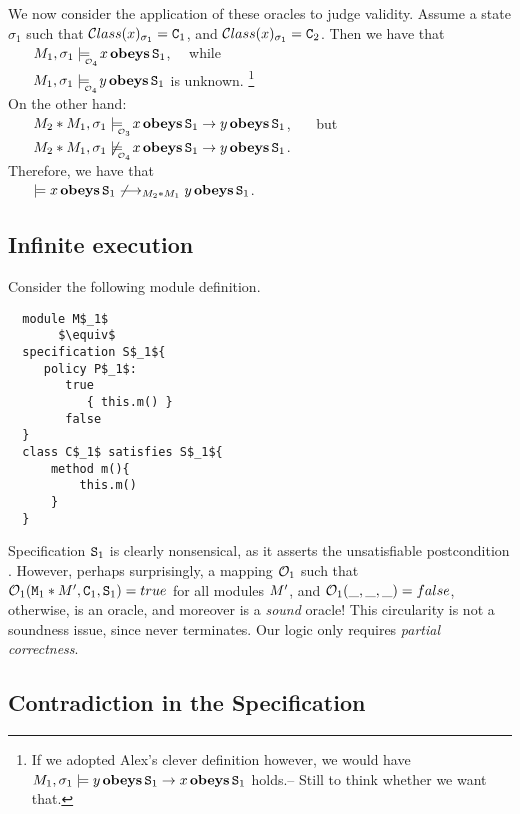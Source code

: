 We now consider the application of these oracles to judge validity.
Assume a state $\sigma_1$ such that ${\cal C}lass(x)_{\sigma_1}={\textrm{\ttfamily{C}}}_1$,
and ${\cal C}lass(x)_{\sigma_1}={\textrm{\ttfamily{C}}}_2$.
Then we have that \\
$~ \strut \ \ \ $ $\M_1, \sigma_1 \modelsWith{\O_4} x \obeys \prg{S}_1$, \ \ while\\
$~ \strut \ \ \ $  $\M_1, \sigma_1 \modelsWith{\O_4} y \obeys \prg{S}_1$ is unknown.
\footnote{If we adopted  Alex's clever definition however,  we would have $M_1, \sigma_1 \models y \,\textbf{\textrm{obeys}}\, {\textrm{\ttfamily{S}}}_1 \rightarrow  x \,\textbf{\textrm{obeys}}\, {\textrm{\ttfamily{S}}}_1$ holds.-- Still to think whether we want that.}
\\
On the other hand:\\
$~ \strut \ \ \ $ $\M_2*\M_1, \sigma_1 \modelsWith{{\O_3}} x \obeys \prg{S}_1 \rightarrow y \obeys \prg{S}_1$, \ \ \ but \\
$~ \strut \ \ \ $  $\M_2*\M_1, \sigma_1 \not\modelsWith{{\O_4} }x \obeys \prg{S}_1 \rightarrow y \obeys \prg{S}_1$.\\ Therefore,
we have that\\
 $~ \strut \ \ \ $ $\models  x \,\textbf{\textrm{obeys}}\, {\textrm{\ttfamily{S}}}_1 \not\longrightarrow_{M_2*M_1} y \,\textbf{\textrm{obeys}}\, {\textrm{\ttfamily{S}}}_1$.


\subsection{Infinite execution}

Consider the following module definition.

 \begin{lstlisting}
  module M$_1$
       $\equiv$
  specification S$_1${
     policy P$_1$:
        true
           { this.m() }
        false
  }
  class C$_1$ satisfies S$_1${
      method m(){
          this.m()
      }
  }
\end{lstlisting}

Specification ${\textrm{\ttfamily{S}}}_1$ is clearly nonsensical, as it asserts the
unsatisfiable postcondition . However, perhaps surprisingly,
 a mapping  ${\cal O}_1$ such that ${\cal O}_1({\textrm{\ttfamily{M}}}_1*M',{\textrm{\ttfamily{C}}}_1,{\textrm{\ttfamily{S}}}_1)=true$ for all modules $M'$,
and ${\cal O}_1(\_,\_,\_)=false$, otherwise, is an oracle, and moreover is a {\em sound} oracle!
 This circularity is not
a soundness issue,   since  never terminates.
Our   logic only requires \emph{partial correctness}.

\subsection{Contradiction in the Specification}

